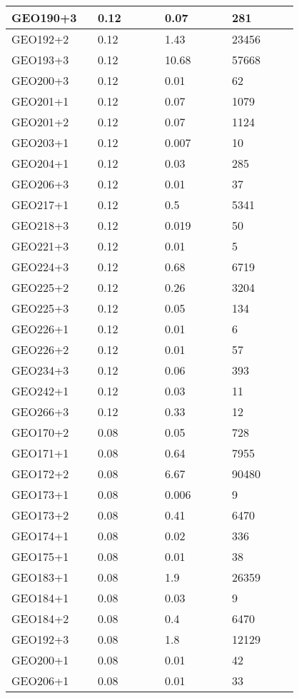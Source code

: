 \begin{longtable}[H]{|p{0.2\linewidth}|p{0.2\linewidth}|p{0.2\linewidth}|p{0.2\linewidth}|}
\hline
GEO190+3 & 0.12 &  0.07 & 281 \\
\hline
GEO192+2 & 0.12 &  1.43 & 23456 \\
\hline
GEO193+3 & 0.12 &  10.68 & 57668 \\
\hline
GEO200+3 & 0.12 &  0.01 & 62 \\
\hline
GEO201+1 & 0.12 &  0.07 & 1079 \\
\hline
GEO201+2 & 0.12 &  0.07 & 1124 \\
\hline
GEO203+1 & 0.12 &  0.007 & 10 \\
\hline
GEO204+1 & 0.12 &  0.03 & 285 \\
\hline
GEO206+3 & 0.12 &  0.01 & 37 \\
\hline
GEO217+1 & 0.12 &  0.5 & 5341 \\
\hline
GEO218+3 & 0.12 &  0.019 & 50 \\
\hline
GEO221+3 & 0.12 &  0.01 & 5 \\
\hline
GEO224+3 & 0.12 &  0.68 & 6719 \\
\hline
GEO225+2 & 0.12 &  0.26 & 3204 \\
\hline
GEO225+3 & 0.12 &  0.05 & 134 \\
\hline
GEO226+1 & 0.12 &  0.01 & 6 \\
\hline
GEO226+2 & 0.12 &  0.01 & 57 \\
\hline
GEO234+3 & 0.12 &  0.06 & 393 \\
\hline
GEO242+1 & 0.12 &  0.03 & 11 \\
\hline
GEO266+3 & 0.12 &  0.33 & 12 \\
\hline
GEO170+2 & 0.08 & 0.05 & 728 \\
\hline
GEO171+1 & 0.08 & 0.64 & 7955 \\
\hline
GEO172+2 & 0.08 & 6.67 & 90480 \\
\hline
GEO173+1 & 0.08 & 0.006 & 9 \\
\hline
GEO173+2 & 0.08 & 0.41 & 6470 \\
\hline
GEO174+1 & 0.08 & 0.02 & 336 \\
\hline
GEO175+1 & 0.08 & 0.01 & 38 \\
\hline
GEO183+1 & 0.08 & 1.9 & 26359 \\
\hline
GEO184+1 & 0.08 & 0.03 & 9 \\
\hline
GEO184+2 & 0.08 & 0.4 & 6470 \\
\hline
GEO192+3 & 0.08 & 1.8 & 12129 \\
\hline
GEO200+1 & 0.08 & 0.01 & 42 \\
\hline
GEO206+1 & 0.08 & 0.01 & 33 \\

\end{longtable}
